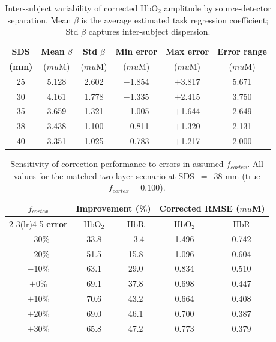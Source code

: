 \documentclass[11pt]{article}
\def\mu{mu}%
\def\mathrm#1{#1}%
\def\,{ }%
\begin{document}
\begin{table}[ht]
\centering
\caption{Inter-subject variability of corrected HbO$_2$ amplitude by source-detector separation. Mean $\beta$ is the average estimated task regression coefficient; Std $\beta$ captures inter-subject dispersion.}
\label{tab:subject_var}
\begin{tabular}{@{}cccccc@{}}
\toprule
\textbf{SDS} & \textbf{Mean} $\beta$ & \textbf{Std} $\beta$ & \textbf{Min error} & \textbf{Max error} & \textbf{Error range}\\
\textbf{(mm)} & ($\mu$M) & ($\mu$M) & ($\mu$M) & ($\mu$M) & ($\mu$M) \\
\midrule
25 & 5.128 & 2.602 & $-$1.854 & $+$3.817 & 5.671 \\
30 & 4.161 & 1.778 & $-$1.335 & $+$2.415 & 3.750 \\
35 & 3.659 & 1.321 & $-$1.005 & $+$1.644 & 2.649 \\
38 & 3.438 & 1.100 & $-$0.811 & $+$1.320 & 2.131 \\
40 & 3.351 & 1.025 & $-$0.783 & $+$1.217 & 2.000 \\
\bottomrule
\end{tabular}
\end{table}

\begin{table}[ht]
\centering
\caption{Sensitivity of correction performance to errors in assumed $f_{\mathrm{cortex}}$. All values for the matched two-layer scenario at SDS~$=$~38\,mm (true $f_{\mathrm{cortex}}=0.100$).}
\label{tab:fcortex_sens}
\begin{tabular}{@{}ccccc@{}}
\toprule
$f_{\mathrm{cortex}}$ & \multicolumn{2}{c}{\textbf{Improvement (\%)}} & \multicolumn{2}{c}{\textbf{Corrected RMSE ($\mu$M)}} \\
\cmidrule(lr){2-3}\cmidrule(lr){4-5}
\textbf{error} & HbO$_2$ & HbR & HbO$_2$ & HbR \\
\midrule
$-$30\% & 33.8 & $-$3.4 & 1.496 & 0.742 \\
$-$20\% & 51.5 & 15.8 & 1.096 & 0.604 \\
$-$10\% & 63.1 & 29.0 & 0.834 & 0.510 \\
$\pm$0\% & 69.1 & 37.8 & 0.698 & 0.447 \\
$+$10\% & 70.6 & 43.2 & 0.664 & 0.408 \\
$+$20\% & 69.0 & 46.1 & 0.700 & 0.387 \\
$+$30\% & 65.8 & 47.2 & 0.773 & 0.379 \\
\bottomrule
\end{tabular}
\end{table}
\end{document}
